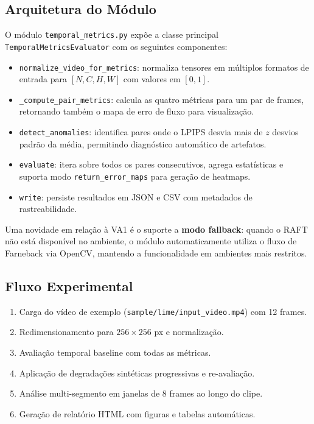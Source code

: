 \documentclass[conference]{IEEEtran}
\begin{document}
\subsection{Arquitetura do Módulo}

O módulo \texttt{temporal\_metrics.py} expõe a classe principal \texttt{TemporalMetricsEvaluator} com os seguintes componentes:

\begin{itemize}
    \item \texttt{normalize\_video\_for\_metrics}: normaliza tensores em múltiplos formatos de entrada para $[N, C, H, W]$ com valores em $[0, 1]$.
    \item \texttt{\_compute\_pair\_metrics}: calcula as quatro métricas para um par de frames, retornando também o mapa de erro de fluxo para visualização.
    \item \texttt{detect\_anomalies}: identifica pares onde o LPIPS desvia mais de $z$ desvios padrão da média, permitindo diagnóstico automático de artefatos.
    \item \texttt{evaluate}: itera sobre todos os pares consecutivos, agrega estatísticas e suporta modo \texttt{return\_error\_maps} para geração de heatmaps.
    \item \texttt{write}: persiste resultados em JSON e CSV com metadados de rastreabilidade.
\end{itemize}

Uma novidade em relação à VA1 é o suporte a \textbf{modo fallback}: quando o RAFT não está disponível no ambiente, o módulo automaticamente utiliza o fluxo de Farneback via OpenCV, mantendo a funcionalidade em ambientes mais restritos.

\subsection{Fluxo Experimental}

\begin{enumerate}
    \item Carga do vídeo de exemplo (\texttt{sample/lime/input\_video.mp4}) com 12 frames.
    \item Redimensionamento para $256 \times 256$ px e normalização.
    \item Avaliação temporal baseline com todas as métricas.
    \item Aplicação de degradações sintéticas progressivas e re-avaliação.
    \item Análise multi-segmento em janelas de 8 frames ao longo do clipe.
    \item Geração de relatório HTML com figuras e tabelas automáticas.
\end{enumerate}
\end{document}
